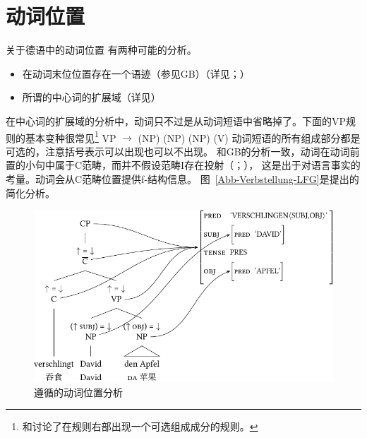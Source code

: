 \section{动词位置}
\label{Abschnitt-Verbstellung-LFG}

关于德语中的动词位置
有两种可能的分析。
\begin{sloppypar}
\begin{itemize}
\item 在动词末位位置存在一个语迹（参见GB\indexgbc）（详见\citealp{Choi99a-u}；\citealp[\S~2.1.4]{Berman96a-u}） 
\item 所谓的中心词的扩展域（详见\citealp{Berman2003a}）
\end{itemize}
\end{sloppypar}

\noindent
在中心词的扩展域的分析中，动词只不过是从动词短语中省略掉了。下面的VP规则的基本变种很常见\footnote{%
\citet[]{Bresnan2001a}和\citet[]{Dalrymple2006a}讨论了在规则右部出现一个可选组成成分的规则。
}
\ea
\label{Regel-LFG-VP-alles-optional}
VP $\to$ (NP) (NP) (NP) (V)
\z
动词短语的所有组成部分都是可选的，注意括号表示可以出现也可以不出现。
和GB的分析一致，动词在动词前置的小句中属于C范畴，而并不假设范畴I存在投射（\citealp{Haider93a,Haider95b-u,Haider97a}；\citealp[\S~IV.3]{Sternefeld2006a-u}），
这是出于对语言事实的考量\citep[\S~3.2.2]{Berman2003a}。动词会从C范畴位置提供f-结构信息。
图~\vref{Abb-Verbstellung-LFG}是\citet[]{Berman2003a}提出的简化分析。
 
\begin{figure}
\centerline{%
\includegraphics{Figures/verschlingt-david-den-apfel-lfg-lsp-crop}
}
\caption{\label{Abb-Verbstellung-LFG}遵循\citet[]{Berman2003a}的动词位置分析}
\end{figure}%

